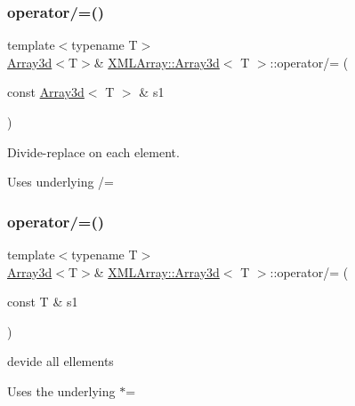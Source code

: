 \subsubsection{\texorpdfstring{operator/=()}{operator/=()}\hspace{0.1cm}{\footnotesize\ttfamily [3/6]}}
{\footnotesize\ttfamily template$<$typename T$>$ \\
\mbox{\hyperlink{classXMLArray_1_1Array3d}{Array3d}}$<$T$>$\& \mbox{\hyperlink{classXMLArray_1_1Array3d}{X\+M\+L\+Array\+::\+Array3d}}$<$ T $>$\+::operator/= (\begin{DoxyParamCaption}\item[{const \mbox{\hyperlink{classXMLArray_1_1Array3d}{Array3d}}$<$ T $>$ \&}]{s1 }\end{DoxyParamCaption})\hspace{0.3cm}{\ttfamily [inline]}}



Divide-\/replace on each element. 

Uses underlying /= \mbox{\label{classXMLArray_1_1Array3d_a28d7fb90e93469c69a1e0bd563967792}} 
\subsubsection{\texorpdfstring{operator/=()}{operator/=()}\hspace{0.1cm}{\footnotesize\ttfamily [4/6]}}
{\footnotesize\ttfamily template$<$typename T$>$ \\
\mbox{\hyperlink{classXMLArray_1_1Array3d}{Array3d}}$<$T$>$\& \mbox{\hyperlink{classXMLArray_1_1Array3d}{X\+M\+L\+Array\+::\+Array3d}}$<$ T $>$\+::operator/= (\begin{DoxyParamCaption}\item[{const T \&}]{s1 }\end{DoxyParamCaption})\hspace{0.3cm}{\ttfamily [inline]}}



devide all ellements 

Uses the underlying $\ast$= \mbox{\label{classXMLArray_1_1Array3d_a28d7fb90e93469c69a1e0bd563967792}} 
